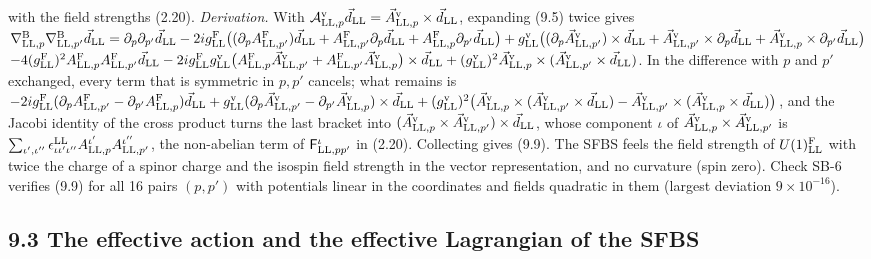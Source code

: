 \documentclass[
  10pt,
]{article}
\begin{document}
with the field strengths (2.20). \emph{Derivation.} With
\(\mathcal A^{\rm v}_{{\rm LL},p}\vec d_{\rm LL}=\vec A^{\rm v}_{{\rm LL},p}\times\vec d_{\rm LL}\),
expanding (9.5) twice gives
\(\nabla^{\rm B}_{{\rm LL},p}\nabla^{\rm B}_{{\rm LL},p'}\vec d_{\rm LL}=\partial_p\partial_{p'}\vec d_{\rm LL}-2ig^{\rm F}_{\rm LL}\big((\partial_pA^{\rm F}_{{\rm LL},p'})\vec d_{\rm LL}+A^{\rm F}_{{\rm LL},p'}\partial_p\vec d_{\rm LL}+A^{\rm F}_{{\rm LL},p}\partial_{p'}\vec d_{\rm LL}\big)+g^{\rm v}_{\rm LL}\big((\partial_p\vec A^{\rm v}_{{\rm LL},p'})\times\vec d_{\rm LL}+\vec A^{\rm v}_{{\rm LL},p'}\times\partial_p\vec d_{\rm LL}+\vec A^{\rm v}_{{\rm LL},p}\times\partial_{p'}\vec d_{\rm LL}\big)\)
\(-4(g^{\rm F}_{\rm LL})^2A^{\rm F}_{{\rm LL},p}A^{\rm F}_{{\rm LL},p'}\vec d_{\rm LL}-2ig^{\rm F}_{\rm LL}g^{\rm v}_{\rm LL}\big(A^{\rm F}_{{\rm LL},p}\vec A^{\rm v}_{{\rm LL},p'}+A^{\rm F}_{{\rm LL},p'}\vec A^{\rm v}_{{\rm LL},p}\big)\times\vec d_{\rm LL}+(g^{\rm v}_{\rm LL})^2\vec A^{\rm v}_{{\rm LL},p}\times(\vec A^{\rm v}_{{\rm LL},p'}\times\vec d_{\rm LL})\).
In the difference with \(p\) and \(p'\) exchanged, every term that is
symmetric in \(p,p'\) cancels; what remains is
\(-2ig^{\rm F}_{\rm LL}(\partial_pA^{\rm F}_{{\rm LL},p'}-\partial_{p'}A^{\rm F}_{{\rm LL},p})\vec d_{\rm LL}+g^{\rm v}_{\rm LL}(\partial_p\vec A^{\rm v}_{{\rm LL},p'}-\partial_{p'}\vec A^{\rm v}_{{\rm LL},p})\times\vec d_{\rm LL}+(g^{\rm v}_{\rm LL})^2\big(\vec A^{\rm v}_{{\rm LL},p}\times(\vec A^{\rm v}_{{\rm LL},p'}\times\vec d_{\rm LL})-\vec A^{\rm v}_{{\rm LL},p'}\times(\vec A^{\rm v}_{{\rm LL},p}\times\vec d_{\rm LL})\big)\),
and the Jacobi identity of the cross product turns the last bracket into
\((\vec A^{\rm v}_{{\rm LL},p}\times\vec A^{\rm v}_{{\rm LL},p'})\times\vec d_{\rm LL}\),
whose component \(\iota\) of
\(\vec A^{\rm v}_{{\rm LL},p}\times\vec A^{\rm v}_{{\rm LL},p'}\) is
\(\sum_{\iota',\iota''}\epsilon^{\rm LL}_{\iota\iota'\iota''}A^{\iota'}_{{\rm LL},p}A^{\iota''}_{{\rm LL},p'}\),
the non-abelian term of \(\mathsf F^\iota_{{\rm LL},pp'}\) in (2.20).
Collecting gives (9.9). The SFBS feels the field strength of
\(U(1)^{\rm F}_{\rm LL}\) with twice the charge of a spinor charge and
the isospin field strength in the vector representation, and no
curvature (spin zero). Check SB-6 verifies (9.9) for all 16 pairs
\((p,p')\) with potentials linear in the coordinates and fields
quadratic in them (largest deviation \(9\times10^{-16}\)).

\hypertarget{the-effective-action-and-the-effective-lagrangian-of-the-sfbs}{%
\subsection{9.3 The effective action and the effective Lagrangian of the
SFBS}\label{the-effective-action-and-the-effective-lagrangian-of-the-sfbs}}
\end{document}
